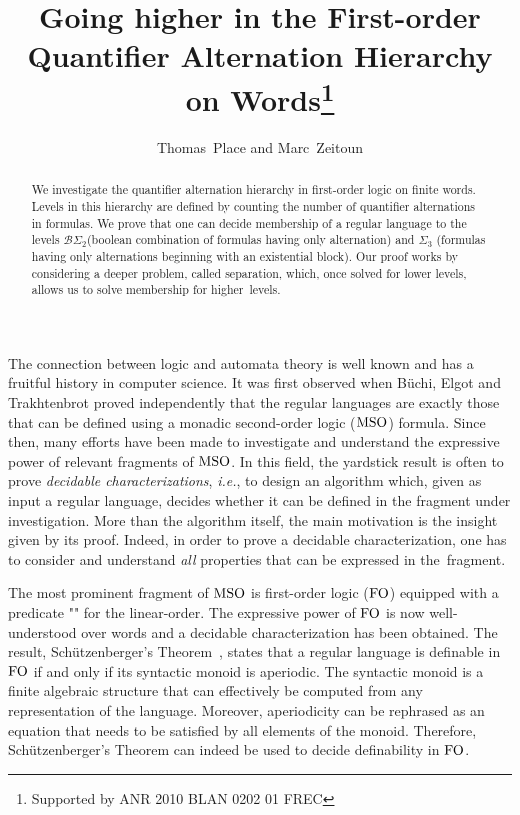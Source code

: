 \documentclass[envcountsame]{llncs}
\title{Going higher in the First-order\\ Quantifier Alternation Hierarchy on Words\thanks{Supported by ANR 2010 BLAN 0202 01 FREC}}
\author{Thomas~Place and Marc~Zeitoun}
\institute{LaBRI, Universit\'e de Bordeaux, France}
\newcommand{\bscd}{\ensuremath{\mathcal{B}\Sigma_{2}}\xspace}
\newcommand{\sict}{\ensuremath{\Sigma_{3}}\xspace}
\newcommand{\mso}{\ensuremath{\textup{MSO}}\xspace}
\newcommand{\fo}{\ensuremath{\textup{FO}}\xspace}
\begin{document}
\maketitle

\begin{abstract}
  We investigate the quantifier alternation hierarchy in first-order
  logic on finite words. Levels in this hierarchy are defined by counting the
  number of quantifier alternations in formulas. We prove that one can
  decide membership of a regular language to the levels \bscd (boolean
  combination of formulas having only  alternation) and \sict
  (formulas having only  alternations beginning with an existential
  block). Our proof works by considering a deeper problem, called
  separation, which, once solved for lower levels, allows us to solve
  membership for higher~levels.
\end{abstract}

\label{sec:intro}
The connection between logic and automata theory is well known and has a
fruitful history in computer science. It was first observed when B\"uchi,
Elgot and Trakhtenbrot proved independently that the regular languages are
exactly those that can be defined using a monadic second-order logic (\mso)
formula. Since then, many efforts have been made to investigate and understand
the expressive power of relevant fragments of \mso. In this field, the
yardstick result is often to prove \emph{decidable
  characterizations}, \emph{i.e.}, to design an algorithm which, given as input a
regular language, decides whether it can be defined in the fragment under
investigation. More than the algorithm itself, the main motivation is
the insight given by its proof. Indeed, in order to prove a decidable
characterization, one has to consider and understand \emph{all}
properties that can be expressed in the~fragment.


The most prominent fragment of \mso is first-order logic (\fo)
equipped with a predicate "" for the linear-order. The expressive
power of \fo is now well-understood over words and a decidable
characterization has been obtained. The result, Sch\"utzenberger's
Theorem~\cite{sfo,mnpfo}, states that a regular language is definable
in \fo if and only if its syntactic monoid is aperiodic. The syntactic
monoid is a finite algebraic structure that can effectively be
computed from any representation of the language. Moreover,
aperiodicity can be rephrased as an equation that needs to be
satisfied by all elements of the monoid. Therefore, Sch\"utzenberger's
Theorem can indeed be used to decide definability in \fo.
\end{document}
